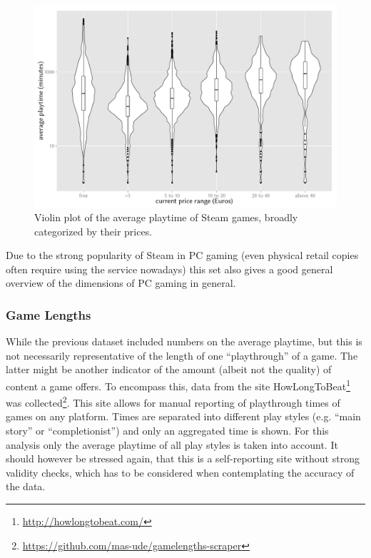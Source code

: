 \begin{figure}[!t]
	\centering
	\includegraphics[width=1.0\columnwidth]{images/steam-cost-vs-playtime.pdf}
	\caption{Violin plot of the average playtime of Steam games, broadly categorized by their prices.}
\label{fig:steam-cost-vs-playtime-violin}
\end{figure}

Due to the strong popularity of Steam in PC gaming (even physical retail copies often require using the service nowadays) this set also gives a good general overview of the dimensions of PC gaming in general.



\subsubsection{Game Lengths}

While the previous dataset included numbers on the average playtime, but this is not necessarily representative of the length of one ``playthrough'' of a game. The latter might be another indicator of the amount (albeit not the quality) of content a game offers. To encompass this, data from the site HowLongToBeat\footnote{\url{http://howlongtobeat.com/}} was collected\footnote{\url{https://github.com/mas-ude/gamelengths-scraper}}. This site allows for manual reporting of playthrough times of games on any platform. Times are separated into different play styles (e.g. ``main story'' or ``completionist'') and only an aggregated time is shown. For this analysis only the average playtime of all play styles is taken into account. It should however be stressed again, that this is a self-reporting site without strong validity checks, which has to be considered when contemplating the accuracy of the data.

